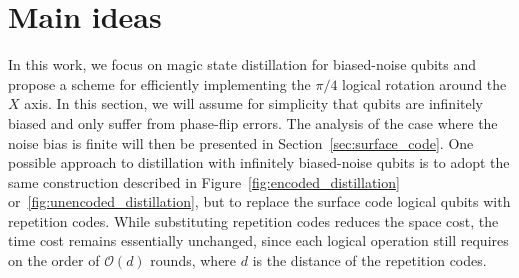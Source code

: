 \documentclass[%
 reprint,
superscriptaddress,
 amsmath,amssymb,
 aps,
]{revtex4-2}
\begin{document}
\section{Main ideas}
\label{sec:main_ideas}

In this work, we focus on magic state distillation for biased-noise qubits and propose a scheme for efficiently implementing the $\pi/4$ logical rotation around the $X$ axis. In this section, we will assume for simplicity that qubits are infinitely biased and only suffer from phase-flip errors. The analysis of the case where the noise bias is finite will then be presented in Section~\ref{sec:surface_code}. One possible approach to distillation with infinitely biased-noise qubits is to adopt the same construction described in Figure~\ref{fig:encoded_distillation} or~\ref{fig:unencoded_distillation}, but to replace the surface code logical qubits with repetition codes. While substituting repetition codes reduces the space cost, the time cost remains essentially unchanged, since each logical operation still requires on the order of $\mathcal O(d)$ rounds, where $d$ is the distance of the repetition codes.
\end{document}
